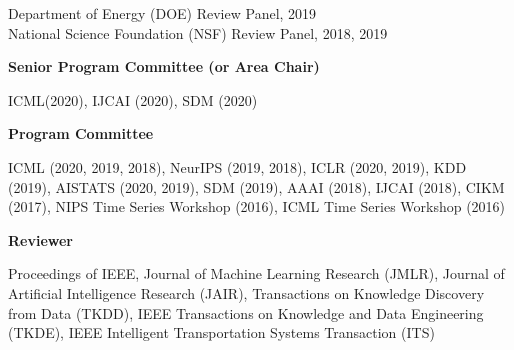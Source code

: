 \documentclass[margin,line]{res}
\newenvironment{list2}{
  \begin{list}{$\bullet$}{%
      \setlength{\itemsep}{0in}
      \setlength{\parsep}{0in} \setlength{\parskip}{0in}
      \setlength{\topsep}{0in} \setlength{\partopsep}{0in} 
      \setlength{\leftmargin}{0.2in}}}{\end{list}}
\begin{document}
\begin{resume}
 Department of Energy (DOE) Review Panel, 2019\\
National Science Foundation (NSF) Review Panel, 2018, 2019



{\bf Senior Program Committee (or Area Chair)}

ICML(2020), IJCAI (2020), SDM (2020)

{\bf Program Committee}

ICML (2020, 2019, 2018), NeurIPS (2019, 2018), ICLR (2020, 2019), KDD (2019), AISTATS (2020, 2019), SDM (2019), AAAI (2018), IJCAI (2018), CIKM (2017), NIPS Time Series Workshop (2016), ICML Time Series Workshop (2016) 


{\bf Reviewer}

Proceedings of IEEE, Journal of Machine Learning Research (JMLR), Journal of Artificial Intelligence Research (JAIR), Transactions on Knowledge Discovery from Data (TKDD), IEEE Transactions on Knowledge and Data Engineering (TKDE),  IEEE Intelligent Transportation Systems Transaction (ITS)




%


%
%
%
%



\end{resume}
\end{document}
